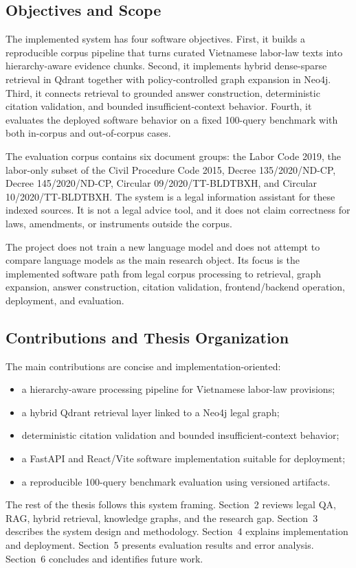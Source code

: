 \subsection{Objectives and Scope}
The implemented system has four software objectives. First, it builds a reproducible corpus pipeline that turns curated Vietnamese labor-law texts into hierarchy-aware evidence chunks. Second, it implements hybrid dense-sparse retrieval in Qdrant together with policy-controlled graph expansion in Neo4j. Third, it connects retrieval to grounded answer construction, deterministic citation validation, and bounded insufficient-context behavior. Fourth, it evaluates the deployed software behavior on a fixed 100-query benchmark with both in-corpus and out-of-corpus cases.

The evaluation corpus contains six document groups: the Labor Code 2019, the labor-only subset of the Civil Procedure Code 2015, Decree 135/2020/ND-CP, Decree 145/2020/ND-CP, Circular 09/2020/TT-BLDTBXH, and Circular 10/2020/TT-BLDTBXH. The system is a legal information assistant for these indexed sources. It is not a legal advice tool, and it does not claim correctness for laws, amendments, or instruments outside the corpus.

The project does not train a new language model and does not attempt to compare language models as the main research object. Its focus is the implemented software path from legal corpus processing to retrieval, graph expansion, answer construction, citation validation, frontend/backend operation, deployment, and evaluation.

\subsection{Contributions and Thesis Organization}
The main contributions are concise and implementation-oriented:
\begin{itemize}
  \item a hierarchy-aware processing pipeline for Vietnamese labor-law provisions;
  \item a hybrid Qdrant retrieval layer linked to a Neo4j legal graph;
  \item deterministic citation validation and bounded insufficient-context behavior;
  \item a FastAPI and React/Vite software implementation suitable for deployment;
  \item a reproducible 100-query benchmark evaluation using versioned artifacts.
\end{itemize}

The rest of the thesis follows this system framing. Section~2 reviews legal QA, RAG, hybrid retrieval, knowledge graphs, and the research gap. Section~3 describes the system design and methodology. Section~4 explains implementation and deployment. Section~5 presents evaluation results and error analysis. Section~6 concludes and identifies future work.
